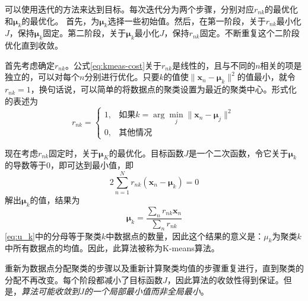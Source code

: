 \documentclass[11pt]{ctexbook}
\begin{document}
可以使用迭代的方法来达到目标。每次迭代分为两个步骤，分别对应$r_{nk}$的最优化和$\bm \mu_k$的最优化。 首先，为$\bm \mu_k$选择一些初始值。然后，在第一阶段，关于$r_{nk}$最小化$J$，保持$\bm \mu_k$固定。第二阶段，关于$\bm \mu_k$最小化$J$，保持$r_{nk}$固定。不断重复这个二阶段优化直到收敛。

首先考虑确定$r_{nk}$。公式\ref{eq:kmeas-cost}关于$r_{nk}$是线性的，且与不同的$n$相关的项是独立的，可以对每个$n$分别进行优化。只要$k$的值使$\|\bm x_n-\bm \mu_k\|^2$的值最小，就令$r_{nk}=1$，换句话说，可以简单的将数据点的聚类设置为最近的聚类中心。形式化的表述为
\begin{equation}
	r_{nk} = \left\{\begin{array}{ll}
		1, & \text{如果} k = \arg\min_{j} \| \bm x_n - \bm \mu_j\|^2 \\
		0, & \text{其他情况}
	\end{array}\right.
\end{equation}

现在考虑$r_{nk}$固定时，关于$\bm \mu_K$的最优化。目标函数$J$是一个二次函数，令它关于$\bm \mu_k$的导数等于$0$，即可达到最小值，即
\begin{equation}
	2\sum_{n=1}^{N}r_{nk}(\bm x_n - \bm \mu_k) = 0
\end{equation}
解出$\bm \mu_k$的值，结果为
\begin{equation}
	\label{eq:u_k}
	\bm \mu_k = \frac{\sum_n r_{nk}\bm x_n}{\sum_n r_{nk}}
\end{equation}
\ref{eq:u_k}中的分母等于聚类$k$中数据点的数量，因此这个结果的意义是：$\mu_k$为聚类$k$中所有数据点的均值。因此，此算法被称为K-means算法。

重新为数据点分配聚类的步骤以及重新计算聚类均值的步骤重复进行，直到聚类的分配不再改变。每个阶段都减小了目标函数$J$，因此算法的收敛性得到保证。但是，\emph{算法可能收敛到$J$的一个局部最小值而非全局最小}。
\end{document}
